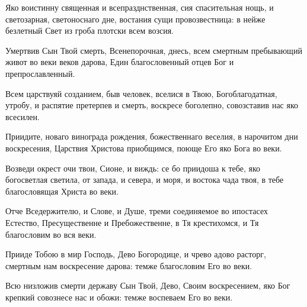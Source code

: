 \begin{mymulticols}
Яко воистинну священная и всепразднственная, сия спасительная нощь, и светозарная, светоноснаго дне, востания сущи провозвестница: в нейже безлетный Свет из гроба плотски всем возсия. 



Умертвив Сын Твой смерть, Всенепорочная, днесь, всем смертным пребывающий живот во веки веков дарова, Един благословенный отцев Бог и препрославленный. 


Всем царствуяй созданием, быв человек, вселися в Твою, Богоблагодатная, утробу, и распятие претерпев и смерть, воскресе боголепно, совозставив нас яко всесилен. 




Приидите, новаго винограда рождения, божественнаго веселия, в нарочитом дни воскресения, Царствия Христова приобщимся, поюще Его яко Бога во веки. 


Возведи окрест очи твои, Сионе, и виждь: се бо приидоша к тебе, яко богосветлая светила, от запада, и севера, и моря, и востока чада твоя, в тебе благословящая Христа во веки. 


Отче Вседержителю, и Слове, и Душе, треми соединяемое во ипостасех Естество, Пресущественне и Пребожественне, в Тя крестихомся, и Тя благословим во вся веки. 



Прииде Тобою в мир Господь, Дево Богородице, и чрево адово расторг, смертным нам воскресение дарова: темже благословим Его во веки. 


Всю низложив смерти державу Сын Твой, Дево, Своим воскресением, яко Бог крепкий совознесе нас и обожи: темже воспеваем Его во веки. 


\end{mymulticols}
